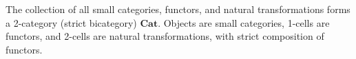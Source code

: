 The collection of all small categories, functors, and natural transformations forms a 2-category (strict bicategory) $\mathbf{Cat}$. Objects are small categories, 1-cells are functors, and 2-cells are natural transformations, with strict composition of functors.